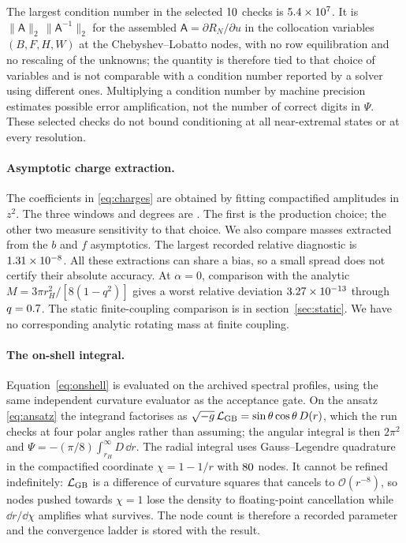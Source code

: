 \documentclass[11pt,a4paper]{article}
\begin{document}
The largest condition number in the selected $10$
checks is $5.4\times 10^{7}$. It is $\|\mathsf A\|_2\,\|\mathsf A^{-1}\|_2$
for the assembled $\mathsf A=\partial R_N/\partial u$ in the collocation
variables $(B,F,H,W)$ at the Chebyshev--Lobatto nodes, with no row
equilibration and no rescaling of the unknowns; the quantity is therefore
tied to that choice of variables and is not comparable with a condition
number reported by a solver using different ones. Multiplying a condition
number by machine precision estimates possible error amplification, not the
number of correct digits in $\Psi$.
These selected checks do not bound conditioning at all
near-extremal states or at every resolution.

\paragraph{Asymptotic charge extraction.}
The coefficients in \eqref{eq:charges} are obtained by fitting
compactified amplitudes in $z^2$. The three windows and degrees are
\Ntailwindows. The first is the production choice; the other two
measure sensitivity to that choice. We also compare masses
extracted from the $b$ and $f$ asymptotics.
The largest recorded relative diagnostic is $1.31\times 10^{-8}$.
All these extractions can share a bias, so a small spread does not
certify their absolute accuracy.
At $\alpha=0$, comparison with the analytic
$M=3\pi r_H^2/[8(1-q^2)]$ gives a worst relative deviation
$3.27\times 10^{-13}$ through $q=0.7$.
The static finite-coupling comparison is in section~\ref{sec:static}.
We have no corresponding analytic rotating mass at finite coupling.

\paragraph{The on-shell integral.}
Equation~\eqref{eq:onshell} is evaluated on the archived spectral profiles,
using the same independent curvature evaluator as the acceptance gate. On the
ansatz \eqref{eq:ansatz} the integrand factorises as
$\sqrt{-g}\,\mathcal L_{\mathrm{GB}}=\sin\theta\cos\theta\,D(r)$, which the run checks at
four polar angles rather than assuming; the angular integral is then $2\pi^2$
and $\Psi=-(\pi/8)\int_{r_H}^{\infty}D\,\dd r$. The radial integral uses
Gauss--Legendre quadrature in the compactified coordinate $\chi=1-1/r$ with
$80$ nodes. It cannot be refined indefinitely: $\mathcal L_{\mathrm{GB}}$ is
a difference of curvature squares that cancels to $\mathcal O(r^{-8})$, so
nodes pushed towards $\chi=1$ lose the density to floating-point cancellation
while $\dd r/\dd\chi$ amplifies what survives. The node count is therefore a
recorded parameter and the convergence ladder is stored with the result.
\end{document}
